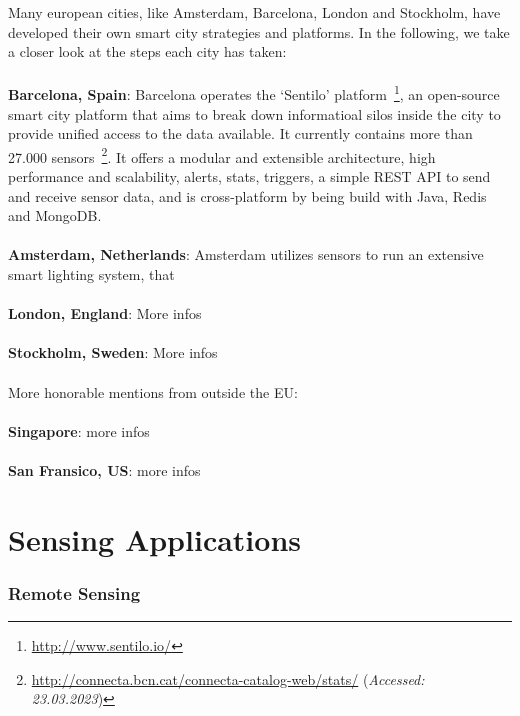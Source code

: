 Many european cities, like Amsterdam, Barcelona, London and Stockholm, have developed their own smart city strategies and platforms. In the following, we take a closer look at the steps each city has taken:\\
\\
\textbf{Barcelona, Spain}: Barcelona operates the `Sentilo' platform~\footnote{\url{http://www.sentilo.io/}}, an open-source smart city platform that aims to break down informatioal silos inside the city to provide unified access to the data available. It currently contains more than 27.000 sensors~\footnote{\url{http://connecta.bcn.cat/connecta-catalog-web/stats/} (\textit{Accessed: 23.03.2023})}. It offers a modular and extensible architecture, high performance and scalability, alerts, stats, triggers, a simple REST API to send and receive sensor data, and is cross-platform by being build with Java, Redis and MongoDB.\\
\\
\textbf{Amsterdam, Netherlands}: Amsterdam utilizes sensors to run an extensive smart lighting system, that\\
\\
\textbf{London, England}: More infos\\
\\
\textbf{Stockholm, Sweden}: More infos\\
\\
More honorable mentions from outside the EU:\\
\\
\textbf{Singapore}: more infos\\
\\
\textbf{San Fransico, US}: more infos\\

\section{Sensing Applications}

\subsubsection{Remote Sensing}

